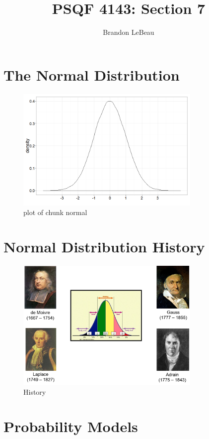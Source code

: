 \documentclass[12pt]{article}
\title{PSQF 4143: Section 7}
\author{Brandon LeBeau}
\date{}
\begin{document}
\maketitle

\section{The Normal Distribution}\label{the-normal-distribution}

\begin{figure}[H]
\centering
\includegraphics[width=3.5in]{figure/normal-1.png}
\caption{plot of chunk normal}
\end{figure}

\section{Normal Distribution History}\label{normal-distribution-history}

\begin{figure}[H]
\centering
\includegraphics[width=3.5in]{normdist_people.png}
\caption{History}
\end{figure}

\section{Probability Models}\label{probability-models}
\end{document}
